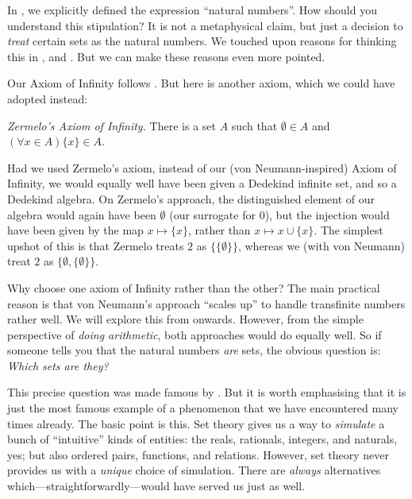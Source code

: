 \documentclass[../../../include/open-logic-section]{subfiles}
\begin{document}
	


In , we explicitly defined
the expression ``natural numbers''. How should you understand this
stipulation? It is not a metaphysical claim, but just a decision to
\emph{treat} certain sets as the natural numbers. We touched upon reasons for thinking this in
,  and
. But we can make these
reasons even more pointed.

Our Axiom of Infinity follows \cite{VonNeumann1925}. But here is
another axiom, which we could have adopted instead:

\begin{defish}
\emph{Zermelo's \cite{Zermelo1908Untersuchungen} Axiom of
Infinity.} There is a set $A$ such that $\emptyset \in A$ and
$(\forall x \in A)\{x\} \in A$. 
\end{defish}

Had we used Zermelo's axiom, instead of our (von Neumann-inspired)
Axiom of Infinity, we would equally well have been given a Dedekind
infinite set, and so a Dedekind algebra. On Zermelo's approach, the
distinguished element of our algebra would again have been $\emptyset$
(our surrogate for $0$), but the injection would have been given by
the map $x \mapsto \{x\}$, rather than $x \mapsto x \cup \{x\}$. The
simplest upshot of this is that Zermelo treats $2$ as
$\{\{\emptyset\}\}$, whereas we (with von Neumann) treat $2$ as
$\{\emptyset, \{\emptyset\}\}$. 

Why choose one axiom of Infinity rather than the other? The main
practical reason is that von Neumann's approach ``scales up'' to
handle transfinite numbers rather well. We will explore this from
 onwards. However, from the simple
perspective of \emph{doing arithmetic}, both approaches would do
equally well. So if someone tells you that the natural numbers
\emph{are} sets, the obvious question is: \emph{Which sets are they?} 

This precise question was made famous by \cite{Benacerraf1965}. But
it is worth emphasising that it is just the most famous example of a
phenomenon that we have encountered many times already. The basic
point is this. Set theory gives us a way to \emph{simulate} a bunch of
``intuitive'' kinds of entities: the reals, rationals, integers, and
naturals, yes; but also ordered pairs, functions, and relations.
However, set theory never provides us with a \emph{unique} choice of
simulation. There are \emph{always} alternatives
which---straightforwardly---would have served us just as well. 
\end{document}
